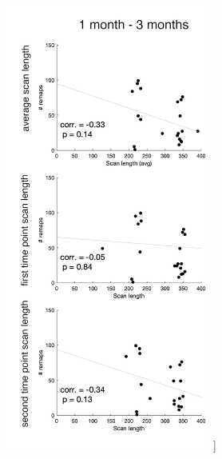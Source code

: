 \documentclass[phd,tocprelim]{cornell}
\renewcommand{\caption}[1]{\singlespacing\hangcaption{#1}\normalspacing}
\begin{document}
\begin{figure}[h!]
		\ContinuedFloat
		\captionsetup{labelformat=adja-page}
    \centering
    \includegraphics[width=0.6\textwidth]{chapter1/SupplementaryFigure4C.png}
    \caption[]{}
\end{figure}
\null
\vfill
\clearpage
\null
\vfill
\end{document}
